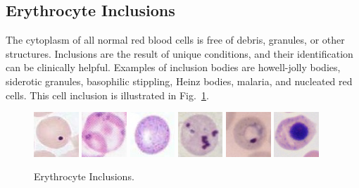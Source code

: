 \subsection{Erythrocyte Inclusions}
The cytoplasm of all normal red blood cells is free of debris, granules, or other structures. Inclusions are the result of unique conditions, and their identification can be clinically helpful. Examples of inclusion bodies are howell-jolly bodies, siderotic granules, basophilic stippling, Heinz bodies, malaria, and nucleated red cells. This cell inclusion is illustrated in Fig.~\ref{fig:Inclusions}.

\begin{figure}[!htbp]
	\centering
	\includegraphics[width=0.15\textwidth]{images/Howell}
	\includegraphics[width=0.15\textwidth]{images/siderotic}
	\includegraphics[width=0.15\textwidth]{images/basophilic}
	\includegraphics[width=0.15\textwidth]{images/Heinz}
	\includegraphics[width=0.15\textwidth]{images/Malaria}
	\includegraphics[width=0.15\textwidth]{images/nucleated}
	\caption{\label{fig:Inclusions} Erythrocyte Inclusions.}
\end{figure}

